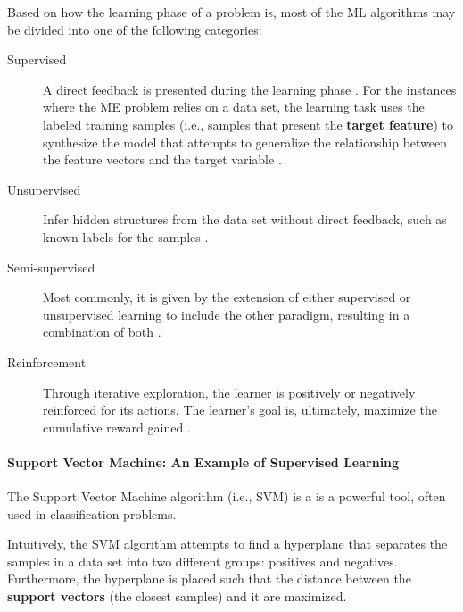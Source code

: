 \documentclass[12pt]{article}
\begin{document}
Based on how the learning phase of a problem is, most of the ML algorithms may be divided into one of the following categories:

\begin{description}
	\item[Supervised] A direct feedback is presented during the learning phase \cite{pat1996}. For the instances where the ME problem relies on a data set, the learning task uses the labeled training samples (i.e., samples that present the \textbf{target feature}) to synthesize the model that attempts to generalize the relationship between the feature vectors and the target variable \cite{awa2015}.

	\item[Unsupervised] Infer hidden structures from the data set without direct feedback, such as known labels for the samples \cite{awa2015}.

	\item[Semi-supervised] Most commonly, it is given by the extension of either supervised or unsupervised learning to include the other paradigm, resulting in a combination of both \cite{zhu2009}.

	\item[Reinforcement] Through iterative exploration, the learner is positively or negatively reinforced for its actions. The learner's goal is, ultimately, maximize the cumulative reward gained \cite{awa2015}.
\end{description}

\paragraph{Support Vector Machine: An Example of Supervised Learning}

The Support Vector Machine algorithm (i.e., SVM) is a is a powerful tool, often used in classification problems.

Intuitively, the SVM algorithm attempts to find a hyperplane that separates the samples in a data set into two different groups: positives and negatives. Furthermore, the hyperplane is placed such that the distance between the \textbf{support vectors} (the closest samples) and it are maximized.
\end{document}
